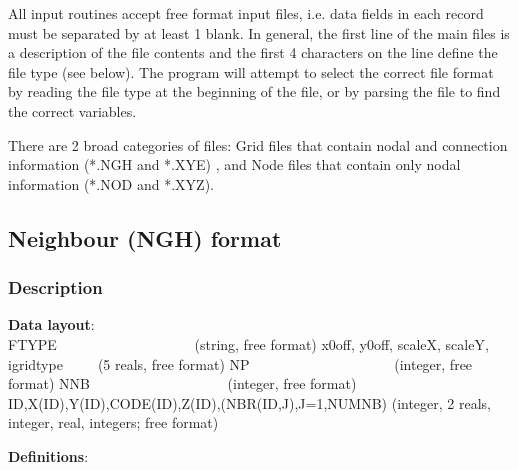 \documentclass{article}
\begin{document}
All input routines accept free format input files, i.e. data fields in each record must be separated by at least 1 blank.
In general, the first line of the main files is a description of the file contents and the first 4 characters
on the line define the file type (see below). The program will attempt to select the correct file format
by reading the file type at the beginning of the file, or by parsing the file to find the correct variables.

There are 2 broad categories of files: Grid files that contain nodal and connection information (*.NGH and *.XYE)
, and Node files that contain only nodal information (*.NOD and *.XYZ). 

\newpage
\subsection[Neighbour (NGH) format]{Neighbour (NGH) format}

\subsubsection[Description]{Description}

\textbf{Data layout}: \\ 

\noindent
FTYPE \ \ \ \ \ \ \ \ \ \ \ \ \ \ \ \ \ \ \ (string, free format) \newline
x0off, y0off, scaleX, scaleY, igridtype\ \ \ \ \ (5 reals, free format)\newline
NP \ \ \ \ \ \ \ \ \ \ \ \ \ \ \ \ \ \ \ \ (integer, free format)\newline
NNB \ \ \ \ \ \ \ \ \ \ \ \ \ \ \ \ \ \ \ (integer, free format)\newline
ID,X(ID),Y(ID),CODE(ID),Z(ID),(NBR(ID,J),J=1,NUMNB)\newline
(integer, 2 reals, integer, real, integers; free format) \newline

\noindent\textbf{Definitions}:\\ 
\end{document}
